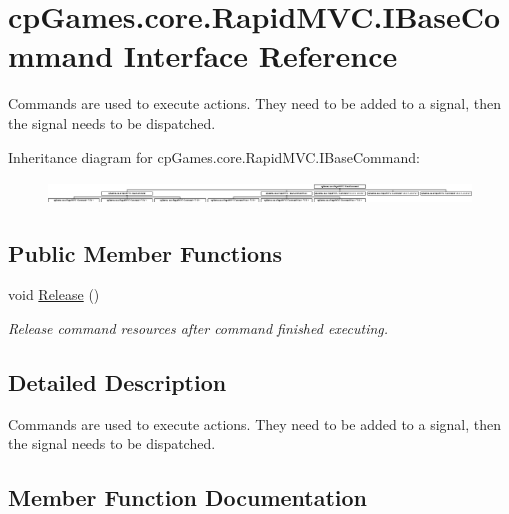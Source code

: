 \hypertarget{interfacecp_games_1_1core_1_1_rapid_m_v_c_1_1_i_base_command}{}\section{cp\+Games.\+core.\+Rapid\+M\+V\+C.\+I\+Base\+Command Interface Reference}
\label{interfacecp_games_1_1core_1_1_rapid_m_v_c_1_1_i_base_command}


Commands are used to execute actions. They need to be added to a signal, then the signal needs to be dispatched.  


Inheritance diagram for cp\+Games.\+core.\+Rapid\+M\+V\+C.\+I\+Base\+Command\+:\begin{figure}[H]
\begin{center}
\leavevmode
\includegraphics[height=0.623145cm]{interfacecp_games_1_1core_1_1_rapid_m_v_c_1_1_i_base_command}
\end{center}
\end{figure}
\subsection*{Public Member Functions}
\begin{DoxyCompactItemize}
\item 
void \mbox{\hyperlink{interfacecp_games_1_1core_1_1_rapid_m_v_c_1_1_i_base_command_aaf935c8b144d93bffac5b2e4fbe9881b}{Release}} ()
\begin{DoxyCompactList}\small\item\em Release command resources after command finished executing. \end{DoxyCompactList}\end{DoxyCompactItemize}


\subsection{Detailed Description}
Commands are used to execute actions. They need to be added to a signal, then the signal needs to be dispatched. 



\subsection{Member Function Documentation}
\mbox{\label{interfacecp_games_1_1core_1_1_rapid_m_v_c_1_1_i_base_command_aaf935c8b144d93bffac5b2e4fbe9881b}} 
